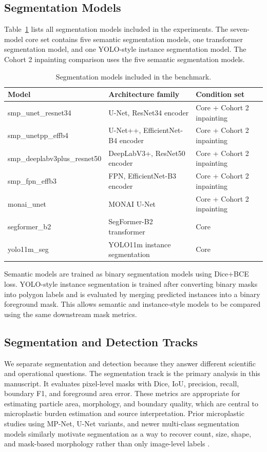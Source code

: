 \documentclass{article}
\begin{document}
\subsection{Segmentation Models}

Table~\ref{tab:segmentation-models} lists all segmentation models included in the experiments. The seven-model core set contains five semantic segmentation models, one transformer segmentation model, and one YOLO-style instance segmentation model. The Cohort 2 inpainting comparison uses the five semantic segmentation models.

\begin{table}[H]
  \centering
  \caption{Segmentation models included in the benchmark.}
  \label{tab:segmentation-models}
  \begin{tabular}{lll}
    \toprule
    \textbf{Model} & \textbf{Architecture family} & \textbf{Condition set} \\
    \midrule
    smp\_unet\_resnet34 & U-Net, ResNet34 encoder & Core + Cohort 2 inpainting \\
    smp\_unetpp\_effb4 & U-Net++, EfficientNet-B4 encoder & Core + Cohort 2 inpainting \\
    smp\_deeplabv3plus\_resnet50 & DeepLabV3+, ResNet50 encoder & Core + Cohort 2 inpainting \\
    smp\_fpn\_effb3 & FPN, EfficientNet-B3 encoder & Core + Cohort 2 inpainting \\
    monai\_unet & MONAI U-Net & Core + Cohort 2 inpainting \\
    segformer\_b2 & SegFormer-B2 transformer & Core \\
    yolo11m\_seg & YOLO11m instance segmentation & Core \\
    \bottomrule
  \end{tabular}
\end{table}

Semantic models are trained as binary segmentation models using Dice+BCE loss. YOLO-style instance segmentation is trained after converting binary masks into polygon labels and is evaluated by merging predicted instances into a binary foreground mask. This allows semantic and instance-style models to be compared using the same downstream mask metrics.

\subsection{Segmentation and Detection Tracks}

We separate segmentation and detection because they answer different scientific and operational questions. The segmentation track is the primary analysis in this manuscript. It evaluates pixel-level masks with Dice, IoU, precision, recall, boundary F1, and foreground area error. These metrics are appropriate for estimating particle area, morphology, and boundary quality, which are central to microplastic burden estimation and source interpretation. Prior microplastic studies using MP-Net, U-Net variants, and newer multi-class segmentation models similarly motivate segmentation as a way to recover count, size, shape, and mask-based morphology rather than only image-level labels \cite{park2022mpnet,shi2022sem,yao2025}.
\end{document}
